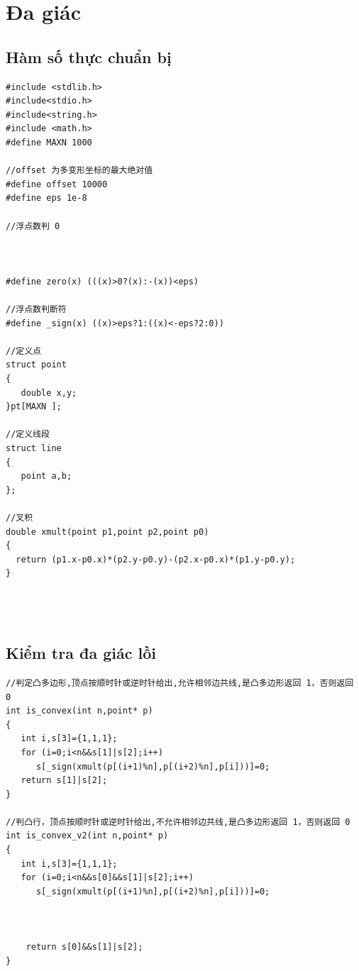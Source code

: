 \documentclass[11pt]{article}
\begin{document}
\section{Đa giác}
\subsection{Hàm số thực chuẩn bị}
\begingroup
\scriptsize
\begin{verbatim}
#include <stdlib.h>
#include<stdio.h>
#include<string.h>
#include <math.h>
#define MAXN 1000

//offset 为多变形坐标的最大绝对值
#define offset 10000
#define eps 1e-8

//浮点数判 0



#define zero(x) (((x)>0?(x):-(x))<eps)

//浮点数判断符
#define _sign(x) ((x)>eps?1:((x)<-eps?2:0))

//定义点
struct point
{
   double x,y;
}pt[MAXN ];

//定义线段
struct line
{
   point a,b;
};

//叉积
double xmult(point p1,point p2,point p0)
{
  return (p1.x-p0.x)*(p2.y-p0.y)-(p2.x-p0.x)*(p1.y-p0.y);
}




\end{verbatim}
\endgroup
\subsection{Kiểm tra đa giác lồi}
\begingroup
\scriptsize
\begin{verbatim}
//判定凸多边形,顶点按顺时针或逆时针给出,允许相邻边共线,是凸多边形返回 1，否则返回
0
int is_convex(int n,point* p)
{
   int i,s[3]={1,1,1};
   for (i=0;i<n&&s[1]|s[2];i++)
      s[_sign(xmult(p[(i+1)%n],p[(i+2)%n],p[i]))]=0;
   return s[1]|s[2];
}

//判凸行，顶点按顺时针或逆时针给出,不允许相邻边共线,是凸多边形返回 1，否则返回 0
int is_convex_v2(int n,point* p)
{
   int i,s[3]={1,1,1};
   for (i=0;i<n&&s[0]&&s[1]|s[2];i++)
      s[_sign(xmult(p[(i+1)%n],p[(i+2)%n],p[i]))]=0;



    return s[0]&&s[1]|s[2];
}




\end{verbatim}
\endgroup
\end{document}
